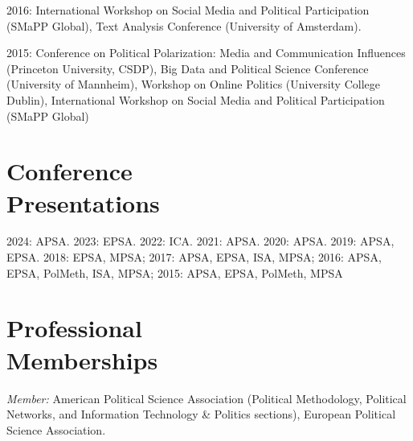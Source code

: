 \documentclass[margin,line,11pt]{resume}
\newcommand{\nl}{\vspace{0.10in}\\}
\begin{document}
\begin{resume}
2016: International Workshop on Social Media and Political Participation (SMaPP Global), Text Analysis Conference (University of Amsterdam).

2015: Conference on Political Polarization: Media and Communication Influences (Princeton University, CSDP), Big Data and Political Science Conference (University of Mannheim), Workshop on Online Politics (University College Dublin), International Workshop on Social Media and Political Participation (SMaPP Global)

        \section{\mysidestyle Conference\\Presentations}
        
2024: APSA. 2023: EPSA. 2022: ICA. 2021: APSA. 2020: APSA. 2019: APSA, EPSA. 2018: EPSA, MPSA; 2017: APSA, EPSA, ISA, MPSA; 2016: APSA, EPSA, PolMeth, ISA, MPSA; 2015: APSA, EPSA, PolMeth, MPSA


\section{\mysidestyle Professional\\Memberships}

\emph{Member:} American Political Science Association (Political Methodology, Political Networks, and Information Technology \& Politics sections), European Political Science Association.


   
    
    

\end{resume}
\end{document}
